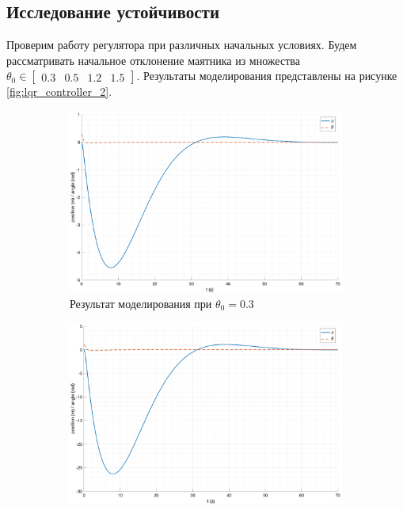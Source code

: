 \subsection{Исследование устойчивости}
Проверим работу регулятора при различных начальных условиях. Будем рассматривать начальное отклонение 
маятника из множества $\theta_0 \in \begin{bmatrix}0.3 & 0.5 & 1.2 & 1.5\end{bmatrix}$. 
Результаты моделирования представлены на рисунке \ref{fig:lqr_controller_2}.
\begin{figure}[ht!]
    \centering
    \begin{subfigure}[b]{0.45\textwidth}
        \centering
        \includegraphics[width=\textwidth]{media/plots/LQR/out_2.png}
        \caption{Результат моделирования при $\theta_0 = 0.3$}
    \end{subfigure}
    \begin{subfigure}[b]{0.45\textwidth}
        \centering
        \includegraphics[width=\textwidth]{media/plots/LQR/out_3.png}

\end{subfigure}
\end{figure}
